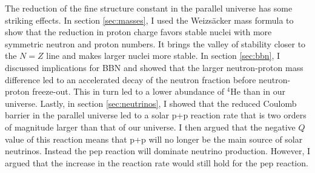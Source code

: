 \documentclass[%
 reprint,
 amsmath,amssymb,
 aps,
]{revtex4-1}
\begin{document}
The reduction of the fine structure constant in the parallel universe has some striking effects. In section \ref{sec:masses}, I used the Weizs\"acker mass formula to show that the reduction in proton charge favors stable nuclei with more symmetric neutron and proton numbers. It brings the valley of stability closer to the $N = Z$ line and makes larger nuclei more stable. In section \ref{sec:bbn}, I discussed implications for BBN and showed that the larger neutron-proton mass difference led to an accelerated decay of the neutron fraction before neutron-proton freeze-out. This in turn led to a lower abundance of ${}^4\text{He}$ than in our universe. Lastly, in section \ref{sec:neutrinos}, I showed that the reduced Coulomb barrier in the parallel universe led to a solar p+p reaction rate that is two orders of magnitude larger than that of our universe. I then argued that the negative $Q$ value of this reaction means that p+p will no longer be the main source of solar neutrinos. Instead the pep reaction will dominate neutrino production. However, I argued that the increase in the reaction rate would still hold for the pep reaction.


 
\end{document}
